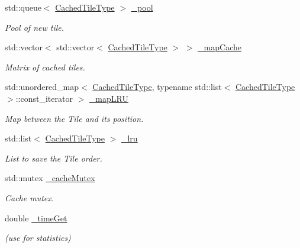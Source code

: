\begin{DoxyCompactItemize}
\item 
std\+::queue$<$ \hyperlink{classfi_1_1FigCache_a7b9bbc4a832c01c3a461f573445c3c41}{Cached\+Tile\+Type} $>$ \hyperlink{classfi_1_1FigCache_a3ae812e7601663ffaa14400d78c3f9c2}{\+\_\+pool}
\begin{DoxyCompactList}\small\item\em Pool of new tile. \end{DoxyCompactList}\item 
std\+::vector$<$ std\+::vector$<$ \hyperlink{classfi_1_1FigCache_a7b9bbc4a832c01c3a461f573445c3c41}{Cached\+Tile\+Type} $>$ $>$ \hyperlink{classfi_1_1FigCache_a2c2c5ed1bb3eeb705920ef48e623f1b4}{\+\_\+map\+Cache}
\begin{DoxyCompactList}\small\item\em Matrix of cached tiles. \end{DoxyCompactList}\item 
std\+::unordered\+\_\+map$<$ \hyperlink{classfi_1_1FigCache_a7b9bbc4a832c01c3a461f573445c3c41}{Cached\+Tile\+Type}, typename std\+::list$<$ \hyperlink{classfi_1_1FigCache_a7b9bbc4a832c01c3a461f573445c3c41}{Cached\+Tile\+Type} $>$\+::const\+\_\+iterator $>$ \hyperlink{classfi_1_1FigCache_a90833a82a97de1cdc869dddd313fab1d}{\+\_\+map\+L\+RU}
\begin{DoxyCompactList}\small\item\em Map between the Tile and it\textquotesingle{}s position. \end{DoxyCompactList}\item 
std\+::list$<$ \hyperlink{classfi_1_1FigCache_a7b9bbc4a832c01c3a461f573445c3c41}{Cached\+Tile\+Type} $>$ \hyperlink{classfi_1_1FigCache_aebef3d39629bfca7fb0d3945b441bd36}{\+\_\+lru}
\begin{DoxyCompactList}\small\item\em List to save the Tile order. \end{DoxyCompactList}\item 
std\+::mutex \hyperlink{classfi_1_1FigCache_a9ddaac59b751d561d4d578dbeb0751df}{\+\_\+cache\+Mutex}
\begin{DoxyCompactList}\small\item\em Cache mutex. \end{DoxyCompactList}\item 
double \hyperlink{classfi_1_1FigCache_ac31074b360f7afe78e7fa08c32152acc}{\+\_\+time\+Get}
\begin{DoxyCompactList}\small\item\em (use for statistics) \end{DoxyCompactList}\item 

\end{DoxyCompactItemize}
